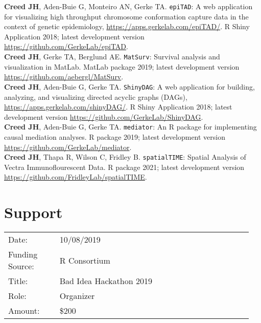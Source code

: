 \documentclass[11pt, a4paper]{article} %
\begin{document}
{\bf Creed JH}, Aden-Buie G, Monteiro AN, Gerke TA. \verb|epiTAD|: A web application for visualizing high throughput chromosome conformation capture data in the context of genetic epidemiology, \href{https://apps.gerkelab.com/epiTAD/}{https://apps.gerkelab.com/epiTAD/}. R Shiny Application 2018; latest development version \href{https://github.com/GerkeLab/epiTAD}{https://github.com/GerkeLab/epiTAD}.\\

{\bf Creed JH}, Gerke TA, Berglund AE. \verb|MatSurv|: Survival analysis and visualization in MatLab. MatLab package 2019; latest development version \href{https://github.com/aebergl/MatSurv}{https://github.com/aebergl/MatSurv}. \\ 

{\bf Creed JH}, Aden-Buie G, Gerke TA. \verb|ShinyDAG|: A web application for building, analyzing, and visualizing directed acyclic graphs (DAGs), \href{https://apps.gerkelab.com/shinyDAG/}{https://apps.gerkelab.com/shinyDAG/}. R Shiny Application 2018; latest development version \href{https://github.com/GerkeLab/ShinyDAG}{https://github.com/GerkeLab/ShinyDAG}. \\

{\bf Creed JH}, Aden-Buie G, Gerke TA. \verb|mediator|: An R package for implementing causal mediation analyses. R package 2019; latest development version \href{https://github.com/GerkeLab/mediator}{https://github.com/GerkeLab/mediator}. \\

{\bf Creed JH}, Thapa R, Wilson C, Fridley B. \verb|spatialTIME|: Spatial Analysis of Vectra Immunoflourescent Data. R package 2021; latest development version
\\\href{https://github.com/FridleyLab/spatialTIME}{https://github.com/FridleyLab/spatialTIME}. \\


\section*{Support}

\begin{longtable}{@{}p{0.2\linewidth} p{0.75\linewidth}}
Date: & 10/08/2019 \\
Funding Source: &  R Consortium \\
Title: & Bad Idea Hackathon 2019 \\
Role: & Organizer \\
Amount: & \$200 \\
\end{longtable}
\end{document}
